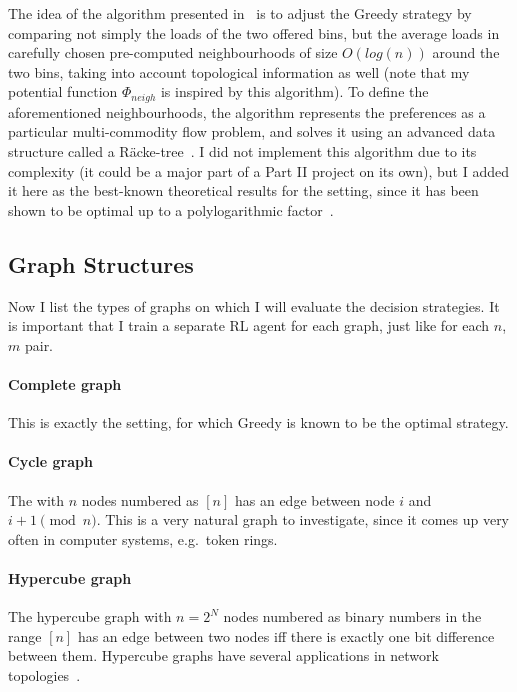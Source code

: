 The idea of the algorithm presented in~\cite{bansal2021twochoicegraphical} is to adjust the Greedy strategy by comparing not simply the loads of the two offered bins, but the average loads in carefully chosen pre-computed neighbourhoods of size $O(log(n))$ around the two bins, taking into account topological information as well (note that my potential function $\Phi_{neigh}$ is inspired by this algorithm). To define the aforementioned neighbourhoods, the algorithm represents the preferences as a particular multi-commodity flow problem, and solves it using an advanced data structure called a R\"{a}cke-tree~\cite{racke2008racketree}. I did not implement this algorithm due to its complexity (it could be a major part of a Part II project on its own), but I added it here as the best-known theoretical results for the \GraphicalTwoChoice setting, since it has been shown to be optimal up to a polylogarithmic factor~\cite{bansal2021twochoicegraphical}.



\subsection{Graph Structures}


Now I list the types of graphs on which I will evaluate the decision strategies. It is important that I train a separate RL agent for each graph, just like for each $n$, $m$ pair.


\paragraph{Complete graph} This is exactly the \TwoChoice setting, for which Greedy is known to be the optimal strategy. 


\paragraph{Cycle graph} The \CycleGraph with $n$ nodes numbered as $[n]$ has an edge between node $i$ and $i+1 \pmod{n}$. This is a very natural graph to investigate, since it comes up very often in computer systems, e.g.\ token rings.


\paragraph{Hypercube graph} The hypercube graph with $n=2^N$ nodes numbered as binary numbers in the range $[n]$ has an edge between two nodes iff there is exactly one bit difference between them. Hypercube graphs have several applications in network topologies~\cite{ostrouchov1987hypercubenetwork}.



